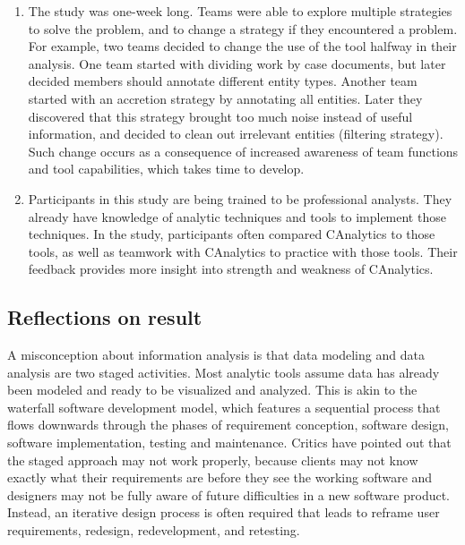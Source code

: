 \begin{enumerate}
\def\labelenumi{\arabic{enumi}.}
\item
  The study was one-week long. Teams were able to explore multiple
  strategies to solve the problem, and to change a strategy if they
  encountered a problem. For example, two teams decided to change the
  use of the tool halfway in their analysis. One team started with
  dividing work by case documents, but later decided members should
  annotate different entity types. Another team started with an
  accretion strategy by annotating all entities. Later they discovered
  that this strategy brought too much noise instead of useful
  information, and decided to clean out irrelevant entities (filtering
  strategy). Such change occurs as a consequence of increased awareness
  of team functions and tool capabilities, which takes time to develop.
\item
  Participants in this study are being trained to be professional
  analysts. They already have knowledge of analytic techniques and tools
  to implement those techniques. In the study, participants often
  compared CAnalytics to those tools, as well as teamwork with
  CAnalytics to practice with those tools. Their feedback provides more
  insight into strength and weakness of CAnalytics.
\end{enumerate}

\subsection{Reflections on result}\label{reflections-on-result}

A misconception about information analysis is that data modeling and
data analysis are two staged activities. Most analytic tools assume data
has already been modeled and ready to be visualized and analyzed. This
is akin to the waterfall software development model, which features a
sequential process that flows downwards through the phases of
requirement conception, software design, software implementation,
testing and maintenance. Critics have pointed out that the staged
approach may not work properly, because clients may not know exactly
what their requirements are before they see the working software and
designers may not be fully aware of future difficulties in a new
software product. Instead, an iterative design process is often required
that leads to reframe user requirements, redesign, redevelopment, and
retesting.

